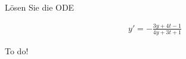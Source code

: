 \begin{exercise}
  Lösen Sie die ODE

  \begin{align*}
    y'= -\frac{3y + 4t - 1}{4y + 3t + 1}
  \end{align*}
\end{exercise}

\begin{solution}
  To do!
\end{solution}
